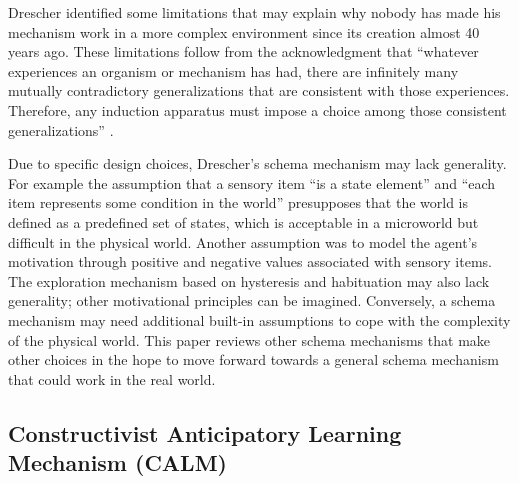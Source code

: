 \documentclass[runningheads]{llncs}
\begin{document}
Drescher identified some limitations that may explain why nobody has made his mechanism work in a more complex environment since its creation almost 40 years ago. 
These limitations follow from the acknowledgment that ``whatever experiences an organism or mechanism has had, there are infinitely many mutually contradictory generalizations that are consistent with those experiences. 
Therefore, any induction apparatus must impose a choice among those consistent generalizations'' \cite[p. 174]{drescher_made-up_1991}.

Due to specific design choices, Drescher's schema mechanism may lack generality.
For example the assumption that a sensory item ``is a state element'' and ``each item represents some condition in the world'' \cite[p. 56]{drescher_made-up_1991} presupposes that the world is defined as a predefined set of states, which is acceptable in a microworld but difficult in the physical world. 
Another assumption was to model the agent's motivation through positive and negative values associated with sensory items.
The exploration mechanism based on hysteresis and habituation may also lack generality;  
other motivational principles can be imagined. 
Conversely, a schema mechanism may need additional built-in assumptions to cope with the complexity of the physical world.
This paper reviews other schema mechanisms that make other choices in the hope to move forward towards a general schema mechanism that could work in the real world.


\subsection{Constructivist Anticipatory Learning Mechanism (CALM)}
\end{document}
